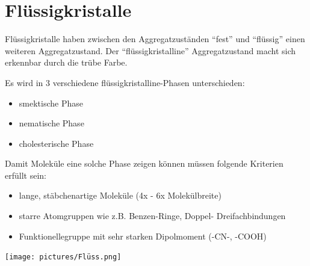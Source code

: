 \section{Flüssigkristalle}
Flüssigkristalle haben zwischen den Aggregatzuständen ``fest'' und ``flüssig'' einen weiteren Aggregatzustand. Der ``flüssigkristalline'' Aggregatzustand macht sich erkennbar durch die trübe Farbe.        

Es wird in 3 verschiedene flüssigkristalline-Phasen unterschieden:
\begin{itemize}
    \item smektische Phase
    \item nematische Phase
    \item cholesterische Phase
\end{itemize}
Damit Moleküle eine solche Phase zeigen können müssen folgende Kriterien erfüllt sein:
\begin{itemize}
    \item lange, stäbchenartige Moleküle (4x - 6x Molekülbreite)
    \item starre Atomgruppen wie z.B. Benzen-Ringe, Doppel- Dreifachbindungen
    \item Funktionellegruppe mit sehr starken Dipolmoment (-CN-, -COOH)
\end{itemize}
\vspace{-0.2cm}
\begin{center}
    \texttt{[image: pictures/Flüss.png]}
\end{center}
\vspace{-0.5cm}

